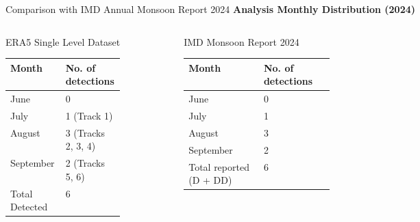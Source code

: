 \documentclass[8pt, aspectratio=169]{beamer}
\begin{document}
\begin{frame}[label=comparison]{Comparison with IMD Annual Monsoon Report 2024}
    \vspace{-0.1cm}
    \textbf{Analysis Monthly Distribution (2024)}

    \vspace{0.1cm}
    \begin{columns}[T, totalwidth=\textwidth]
        \footnotesize
        \begin{block}{ERA5 Single Level Dataset}
            \begin{tabular}{p{0.4\linewidth} p{0.3\linewidth}}
                \toprule
                Month      & No. of detections  \\
                \midrule
                June      & 0                  \\
                July      & 1 (Track 1)        \\
                August    & 3 (Tracks 2, 3, 4) \\
                September & 2 (Tracks 5, 6)    \\
                \midrule
                Total Detected   & 6           \\
                \bottomrule
            \end{tabular}
        \end{block}

        \footnotesize
        \begin{block}{IMD Monsoon Report 2024}
            \begin{tabular}{p{0.4\linewidth} p{0.3\linewidth}}
                \toprule
                Month      & No. of detections          \\
                \midrule
                June      & 0                          \\
                July      & 1                          \\
                August    & 3                          \\
                September & 2                          \\
                \midrule
                Total reported (D + DD)\footnotemark[5] & 6 \\
                \bottomrule
            \end{tabular}
        \end{block}
    \end{columns}


\end{frame}
\end{document}
